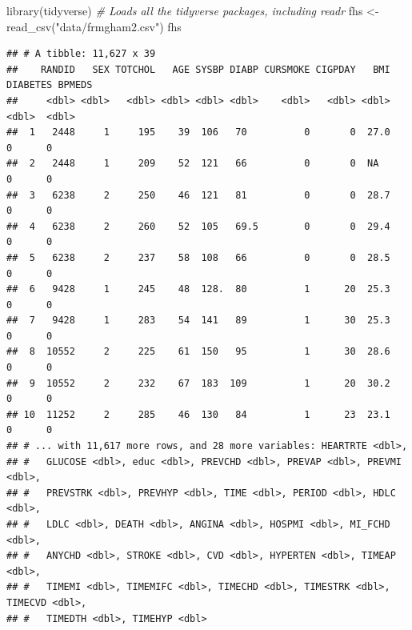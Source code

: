 \documentclass[
]{book}
\newenvironment{Shaded}{\begin{snugshade}}{\end{snugshade}}
\newcommand{\CommentTok}[1]{\textcolor[rgb]{0.56,0.35,0.01}{\textit{#1}}}
\newcommand{\FunctionTok}[1]{\textcolor[rgb]{0.00,0.00,0.00}{#1}}
\newcommand{\NormalTok}[1]{#1}
\newcommand{\OtherTok}[1]{\textcolor[rgb]{0.56,0.35,0.01}{#1}}
\newcommand{\StringTok}[1]{\textcolor[rgb]{0.31,0.60,0.02}{#1}}
\begin{document}
\begin{Shaded}
\begin{Highlighting}[]
\FunctionTok{library}\NormalTok{(tidyverse) }\CommentTok{\# Loads all the tidyverse packages, including readr}
\NormalTok{fhs }\OtherTok{\textless{}{-}} \FunctionTok{read\_csv}\NormalTok{(}\StringTok{"data/frmgham2.csv"}\NormalTok{)}
\NormalTok{fhs}
\end{Highlighting}
\end{Shaded}

\begin{verbatim}
## # A tibble: 11,627 x 39
##    RANDID   SEX TOTCHOL   AGE SYSBP DIABP CURSMOKE CIGPDAY   BMI DIABETES BPMEDS
##     <dbl> <dbl>   <dbl> <dbl> <dbl> <dbl>    <dbl>   <dbl> <dbl>    <dbl>  <dbl>
##  1   2448     1     195    39  106   70          0       0  27.0        0      0
##  2   2448     1     209    52  121   66          0       0  NA          0      0
##  3   6238     2     250    46  121   81          0       0  28.7        0      0
##  4   6238     2     260    52  105   69.5        0       0  29.4        0      0
##  5   6238     2     237    58  108   66          0       0  28.5        0      0
##  6   9428     1     245    48  128.  80          1      20  25.3        0      0
##  7   9428     1     283    54  141   89          1      30  25.3        0      0
##  8  10552     2     225    61  150   95          1      30  28.6        0      0
##  9  10552     2     232    67  183  109          1      20  30.2        0      0
## 10  11252     2     285    46  130   84          1      23  23.1        0      0
## # ... with 11,617 more rows, and 28 more variables: HEARTRTE <dbl>,
## #   GLUCOSE <dbl>, educ <dbl>, PREVCHD <dbl>, PREVAP <dbl>, PREVMI <dbl>,
## #   PREVSTRK <dbl>, PREVHYP <dbl>, TIME <dbl>, PERIOD <dbl>, HDLC <dbl>,
## #   LDLC <dbl>, DEATH <dbl>, ANGINA <dbl>, HOSPMI <dbl>, MI_FCHD <dbl>,
## #   ANYCHD <dbl>, STROKE <dbl>, CVD <dbl>, HYPERTEN <dbl>, TIMEAP <dbl>,
## #   TIMEMI <dbl>, TIMEMIFC <dbl>, TIMECHD <dbl>, TIMESTRK <dbl>, TIMECVD <dbl>,
## #   TIMEDTH <dbl>, TIMEHYP <dbl>
\end{verbatim}
\end{document}
